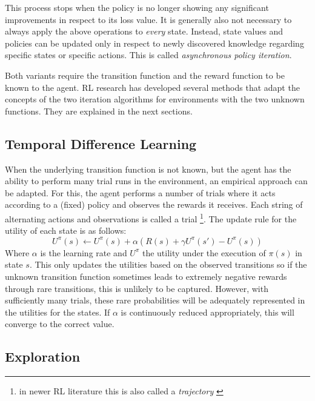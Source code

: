 This process stops when the policy is no longer showing any significant improvements in respect to its loss value. It is
generally also not necessary to always apply the above operations to \emph{every} state. Instead, state values and
policies can be updated only in respect to newly discovered knowledge regarding specific states or specific actions.
This is called \emph{asynchronous policy iteration}. 

Both variants require the transition function and the reward function to be known to the agent. \ac {RL} research has
developed several methods that adapt the concepts of the two iteration algorithms for environments with the two unknown
functions. They are explained in the next sections. 

\subsection{Temporal Difference Learning}%
\label{sub:temporal_difference_learning}

When the underlying transition function is not known, but the agent has the ability to perform many trial runs in the
environment, an empirical approach can be adapted. For this, the agent performs a number of trials where it acts
according to a (fixed) policy and observes the rewards it receives. Each string of alternating actions and observations
is called a trial
\footnote{in newer \ac {RL} literature this is also called a \emph{trajectory} \citep{proximalpolicyopt, heess2017emergence} }. 
The update rule for the utility of each state is as follows:
\begin{equation}
U^\pi(s) \gets U^\pi(s) + \alpha(R(s) + \gamma U^\pi(s') - U^\pi(s))
\end{equation}
Where $\alpha$ is the learning rate and $U^\pi$ the utility under the execution of $\pi(s)$ in state $s$. This only
updates the utilities based on the observed transitions so if the unknown transition function sometimes leads to
extremely negative rewards through rare transitions, this is unlikely to be captured. However, with sufficiently many
trials, these rare probabilities will be adequately represented in the utilities for the states. If $\alpha$ is
continuously reduced appropriately, this will converge to the correct value. 

\subsection{Exploration}%
\label{sub:exploration}

